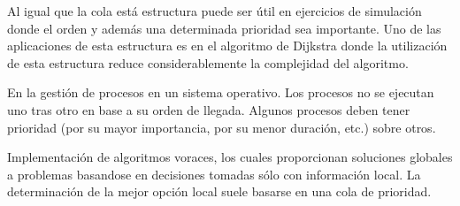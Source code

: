 Al igual que la cola está estructura puede ser útil en ejercicios de simulación donde el orden y además una determinada prioridad sea importante. Uno de las aplicaciones de esta estructura es en el algoritmo de Dijkstra donde la utilización de esta estructura reduce considerablemente la complejidad del algoritmo.

En la gestión de procesos en un sistema operativo. Los procesos no se ejecutan uno
tras otro en base a su orden de llegada. Algunos procesos deben tener prioridad (por su mayor importancia, por su menor duración, etc.) sobre otros.

Implementación de algoritmos voraces, los cuales proporcionan soluciones globales
a problemas basandose en decisiones tomadas sólo con información local. La
determinación de la mejor opción local suele basarse en una cola de prioridad.

